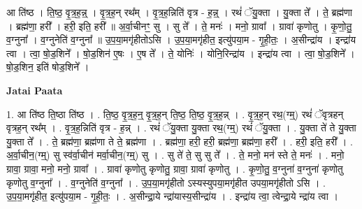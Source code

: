 \documentclass[17pt]{extarticle}
\begin{document}
आ ति॑ष्ठ । ति॒ष्ठ॒ वृ॒त्र॒ह॒न्न्॒ । वृ॒त्र॒ह॒न् रथ᳚म् । वृ॒त्र॒ह॒न्निति॑ वृत्र - ह॒न्न्॒ । रथं॑ ॅयु॒क्ता । यु॒क्ता ते᳚ । ते॒ ब्रह्म॑णा । ब्रह्म॑णा॒ हरी᳚ । हरी॒ इति॒ हरी᳚ ॥ अ॒र्वा॒चीनꣳ॒॒ सु । सु ते᳚ । ते॒ मनः॑ । मनो॒ ग्रावा᳚ । ग्रावा॑ कृणोतु । कृ॒णो॒तु॒ व॒ग्नुना᳚ । व॒ग्नुनेति॑ व॒ग्नुना᳚ ॥ उ॒प॒या॒मगृ॑हीतोऽसि । उ॒प॒या॒मगृ॑हीत॒ इत्यु॑पया॒म - गृ॒ही॒तः॒ । अ॒सीन्द्रा॑य । इन्द्रा॑य त्वा । त्वा॒ षो॒ड॒शिने᳚ । षो॒ड॒शिन॑ ए॒षः । ए॒ष ते᳚ । ते॒ योनिः॑ । योनि॒रिन्द्रा॑य । इन्द्रा॑य त्वा । त्वा॒ षो॒ड॒शिने᳚ । षो॒ड॒शिन॒ इति॑ षोड॒शिने᳚ । \newline

\textbf{Jatai Paata} \newline

1. आ ति॑ष्ठ ति॒ष्ठा ति॑ष्ठ । . ति॒ष्ठ॒ वृ॒त्र॒ह॒न्॒ वृ॒त्र॒ह॒न् ति॒ष्ठ॒ ति॒ष्ठ॒ वृ॒त्र॒ह॒न्न् । . वृ॒त्र॒ह॒न् रथ॒(ग्म्॒) रथं॑ ॅवृत्रहन् वृत्रह॒न् रथ᳚म् । . वृ॒त्र॒ह॒न्निति॑ वृत्र - ह॒न्न् । . रथं॑ ॅयु॒क्ता यु॒क्ता रथ॒(ग्म्॒) रथं॑ ॅयु॒क्ता । . यु॒क्ता ते॑ ते यु॒क्ता यु॒क्ता ते᳚ । . ते॒ ब्रह्म॑णा॒ ब्रह्म॑णा ते ते॒ ब्रह्म॑णा । . ब्रह्म॑णा॒ हरी॒ हरी॒ ब्रह्म॑णा॒ ब्रह्म॑णा॒ हरी᳚ । . हरी॒ इति॒ हरी᳚ । . अ॒र्वा॒चीन॒(ग्म्॒) सु स्व॑र्वा॒चीन॑ मर्वा॒चीन॒(ग्म्॒) सु । . सु ते॑ ते॒ सु सु ते᳚ । . ते॒ मनो॒ मन॑ स्ते ते॒ मनः॑ । . मनो॒ ग्रावा॒ ग्रावा॒ मनो॒ मनो॒ ग्रावा᳚ । . ग्रावा॑ कृणोतु कृणोतु॒ ग्रावा॒ ग्रावा॑ कृणोतु । . कृ॒णो॒तु॒ व॒ग्नुना॑ व॒ग्नुना॑ कृणोतु कृणोतु व॒ग्नुना᳚ । . व॒ग्नुनेति॑ व॒ग्नुना᳚ । . उ॒प॒या॒मगृ॑हीतो ऽस्यस्युपया॒मगृ॑हीत उपया॒मगृ॑हीतो ऽसि । . उ॒प॒या॒मगृ॑हीत॒ इत्यु॑पया॒म - गृ॒ही॒तः॒ । . अ॒सीन्द्रा॒ये न्द्रा॑यास्य॒सीन्द्रा॑य । . इन्द्रा॑य त्वा॒ त्वेन्द्रा॒ये न्द्रा॑य त्वा । \newline
\end{document}

